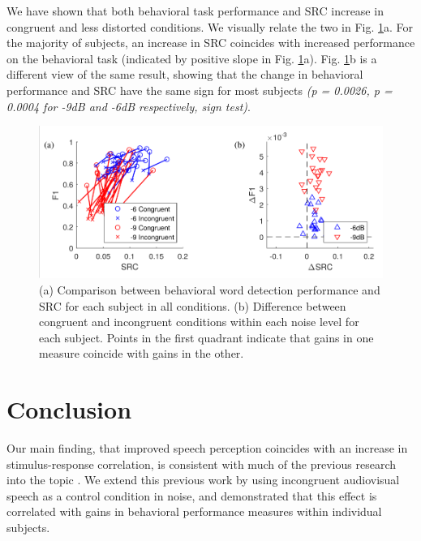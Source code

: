 \documentclass[10pt,letterpaper]{article}
\begin{document}
  We have shown that both behavioral task performance and SRC increase in 
  congruent and less distorted conditions. We visually relate the two 
  in Fig. \ref{srcVsBehavior}a. For the majority of subjects, an increase 
  in SRC coincides with increased performance on the behavioral task 
  (indicated by positive slope in Fig. \ref{srcVsBehavior}a). Fig. 
  \ref{srcVsBehavior}b is a different view of the same result, showing that
  the change in behavioral performance and SRC have the same sign for most 
  subjects \textit{(p = 0.0026, p = 0.0004 for -9dB and -6dB respectively, 
  sign test)}.

  \begin{figure}[]
    \begin{center}
      \includegraphics[scale=0.8]{Figure5ab}
    \end{center}
    \caption{(a) Comparison between behavioral word detection performance
    and SRC for each subject in all conditions. (b) Difference between
    congruent and incongruent conditions within each noise level for
    each subject. Points in the first quadrant indicate that gains in
    one measure coincide with gains in the other.}
    \label{srcVsBehavior}
  \end{figure}


\section{Conclusion}

  Our main finding, that improved speech perception coincides with an increase 
  in stimulus-response correlation, is consistent with much of the previous 
  research into the topic 
  \cite{Ding2013,Peelle2013,Vanthornhout2017,Crosse2015}. 
  We extend this previous work by using incongruent audiovisual speech as a 
  control condition in noise, and demonstrated that this effect is correlated 
  with gains in behavioral performance measures within individual subjects.
\end{document}
